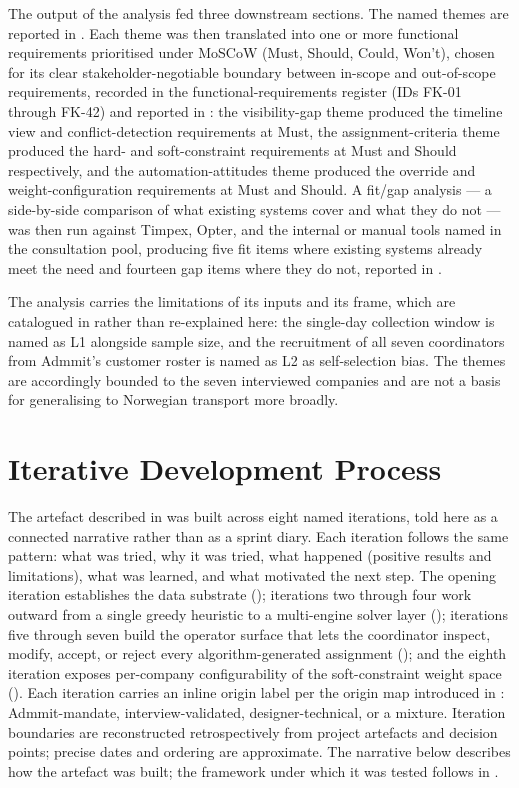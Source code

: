 The output of the analysis fed three downstream sections. The named themes are reported in . Each theme was then translated into one or more functional requirements prioritised under MoSCoW (Must, Should, Could, Won't), chosen for its clear stakeholder-negotiable boundary between in-scope and out-of-scope requirements, recorded in the functional-requirements register (IDs FK-01 through FK-42) and reported in : the visibility-gap theme produced the timeline view and conflict-detection requirements at Must, the assignment-criteria theme produced the hard- and soft-constraint requirements at Must and Should respectively, and the automation-attitudes theme produced the override and weight-configuration requirements at Must and Should. A fit/gap analysis --- a side-by-side comparison of what existing systems cover and what they do not --- was then run against Timpex, Opter, and the internal or manual tools named in the consultation pool, producing five fit items where existing systems already meet the need and fourteen gap items where they do not, reported in .

The analysis carries the limitations of its inputs and its frame, which are catalogued in  rather than re-explained here: the single-day collection window is named as L1 alongside sample size, and the recruitment of all seven coordinators from Admmit's customer roster is named as L2 as self-selection bias. The themes are accordingly bounded to the seven interviewed companies and are not a basis for generalising to Norwegian transport more broadly.


\section{Iterative Development Process}
\label{sec:iterations}

The artefact described in  was built across eight named iterations, told here as a connected narrative rather than as a sprint diary. Each iteration follows the same pattern: what was tried, why it was tried, what happened (positive results and limitations), what was learned, and what motivated the next step. The opening iteration establishes the data substrate (); iterations two through four work outward from a single greedy heuristic to a multi-engine solver layer (); iterations five through seven build the operator surface that lets the coordinator inspect, modify, accept, or reject every algorithm-generated assignment (); and the eighth iteration exposes per-company configurability of the soft-constraint weight space (). Each iteration carries an inline origin label per the origin map introduced in : Admmit-mandate, interview-validated, designer-technical, or a mixture. Iteration boundaries are reconstructed retrospectively from project artefacts and decision points; precise dates and ordering are approximate. The narrative below describes how the artefact was built; the framework under which it was tested follows in .

